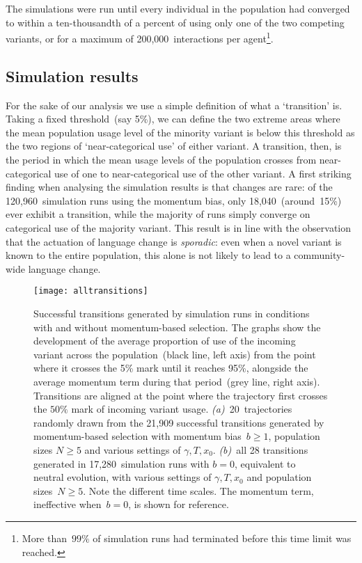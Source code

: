 \documentclass[10pt]{article}
\begin{document}
The simulations were run until every individual in the population had converged to within a ten-thousandth of a percent of using only one of the two competing variants, or for a maximum of 200,000~interactions per agent\footnote{More than~$99\%$ of simulation runs had terminated before this time limit was reached.}.

\subsection{Simulation results}

For the sake of our analysis we use a simple definition of what a `transition' is. Taking a fixed threshold~(say 5\%), we can define the two extreme areas where the mean population usage level of the minority variant is below this threshold as the two regions of `near-categorical use' of either variant. A transition, then, is the period in which the mean usage levels of the population crosses from near-categorical use of one to near-categorical use of the other variant. A first striking finding when analysing the simulation results is that changes are rare: of the 120,960~simulation runs using the momentum bias, only 18,040~(around~15\%) ever exhibit a transition, while the majority of runs simply converge on categorical use of the majority variant. This result is in line with the observation that the actuation of language change is \emph{sporadic}: even when a novel variant is known to the entire population, this alone is not likely to lead to a community-wide language change.

\begin{figure}
\centering
\texttt{[image: alltransitions]}
\caption[Successful transitions generated by simulation runs in conditions with and without the momentum-based selection bias]{Successful transitions generated by simulation runs in conditions with and without momentum-based selection. The graphs show the development of the average proportion of use of the incoming variant across the population~(black line, left axis) from the point where it crosses the 5\% mark until it reaches 95\%, alongside the average momentum term during that period~(grey line, right axis). Transitions are aligned at the point where the trajectory first crosses the $50\%$ mark of incoming variant usage. \textit{(a)}~20~trajectories randomly drawn from the 21,909 successful transitions generated by momentum-based selection with momentum bias~$b\ge1$, population sizes $N\ge5$ and various settings of $\gamma, T, x_0$. 
\textit{(b)}~all 28 transitions generated in 17,280~simulation runs with $b=0$, equivalent to neutral evolution, with various settings of $\gamma, T, x_0$ and population sizes~$N\ge5$. 
Note the different time scales. The momentum term, ineffective when~$b=0$, is shown for reference.}
\label{fig:alltransitions}
\end{figure}
\end{document}
